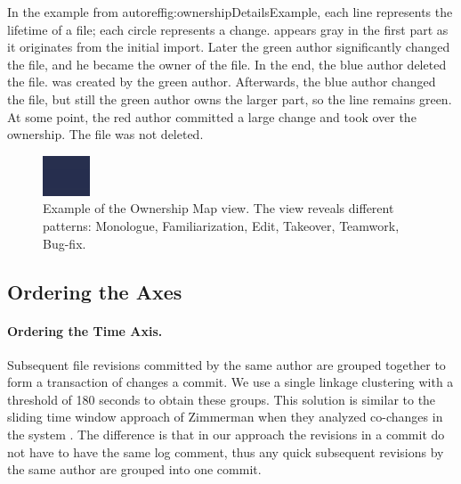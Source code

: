 \documentclass[10pt]{book}
\begin{document}
In the example from autoref{fig:ownershipDetailsExample}, each line represents the lifetime of a file; each circle represents a change.  appears gray in the first part as it originates from the initial import. Later the green author significantly changed the file, and he became the owner of the file. In the end, the blue author deleted the file.  was created by the green author. Afterwards, the blue author changed the file, but still the green author owns the larger part, so the line remains green. At some point, the red author committed a large change and took over the ownership. The file was not deleted.

\begin{figure}[hbt]
\begin{center}
\includegraphics{owners-map-example}
\caption{Example of the Ownership Map view. The view reveals different patterns:
Monologue, Familiarization, Edit, Takeover, Teamwork, Bug-fix.}
\label{fig:ownershipMapExample}
\end{center}
\end{figure}

\subsection{Ordering the Axes}

\paragraph{Ordering the Time Axis.}
Subsequent file revisions committed by the same author are grouped together to form a transaction of changes \ie a commit. We use a single linkage clustering with a threshold of 180 seconds to obtain these groups. This solution is similar to the sliding time window approach of Zimmerman \etal when they analyzed co-changes in the system \cite{Zimm04a}. The difference is that in our approach the revisions in a commit do not have to have the same log comment, thus any quick subsequent revisions by the same author are grouped into one commit.
\end{document}
